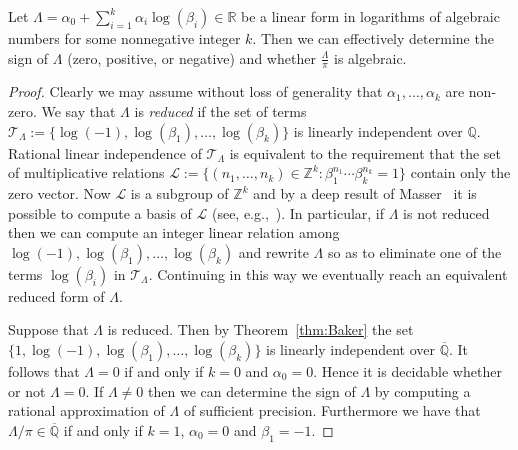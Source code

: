 \documentclass[format=acmsmall, review=false, screen=true]{acmart}
\newcommand{\Reals}{\mathbb{R}}
\begin{document}
\begin{proposition}
Let $\Lambda = \alpha_0+\sum_{i=1}^k \alpha_i\log(\beta_i) \in \Reals$
be a linear form in logarithms of algebraic numbers for some
nonnegative integer $k$.  Then we can effectively determine the sign
of $\Lambda$ (zero, positive, or negative) and whether
$\frac{\Lambda}{\pi}$ is algebraic.
\label{prop:linear-form-test}
\end{proposition}
\begin{proof}
Clearly we may assume without loss of generality that
$\alpha_1,\ldots,\alpha_k$ are non-zero.  We say that $\Lambda$ is
\emph{reduced} if the set of terms $\mathcal{T}_\Lambda:=\{\log(-1),
\log(\beta_1),\ldots,\log(\beta_k) \}$ is linearly independent over
$\mathbb{Q}$.  Rational linear independence of $\mathcal{T}_\Lambda$
is equivalent to the requirement that the set of multiplicative
relations $\mathcal{L}:=\{ (n_1,\ldots,n_k) \in \mathbb{Z}^k :
\beta_1^{n_1} \cdots \beta_k^{n_k}= 1 \}$ contain only the zero
vector.  Now $\mathcal{L}$ is a subgroup of $\mathbb{Z}^k$ and by a
deep result of Masser~\cite{Mas88} it is possible to compute a basis
of $\mathcal{L}$ (see, e.g.,~\cite{ABC}).  In particular, if $\Lambda$
is not reduced then we can compute an integer linear relation among
$\log(-1),\log(\beta_1),\ldots,\log(\beta_k)$ and rewrite $\Lambda$ so
as to eliminate one of the terms $\log(\beta_i)$ in
$\mathcal{T}_{\Lambda}$.  Continuing in this way we eventually reach an equivalent
reduced form of $\Lambda$.

Suppose that $\Lambda$ is reduced.  Then by Theorem~\ref{thm:Baker}
the set $\{1,\log(-1), \log(\beta_1),\ldots,\log(\beta_k) \}$ is
linearly independent over $\overline{\mathbb{Q}}$.  It follows that
$\Lambda=0$ if and only if $k=0$ and $\alpha_0=0$.  Hence it is
decidable whether or not $\Lambda=0$.  If $\Lambda \neq 0$ then we can
determine the sign of $\Lambda$ by computing a rational approximation
of $\Lambda$ of sufficient precision.  Furthermore we have that
$\Lambda / \pi \in \overline{\mathbb{Q}}$ if and only if $k=1$,
$\alpha_0 = 0$ and $\beta_1 = -1$.
\end{proof}
\end{document}
